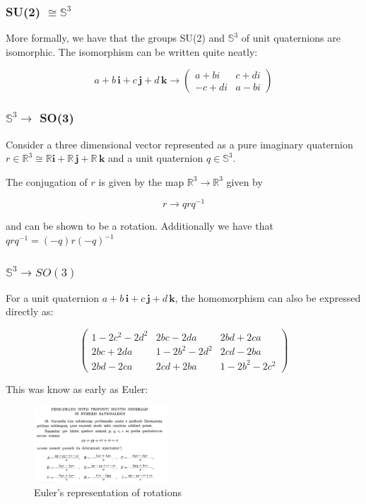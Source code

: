 \documentclass{beamer}
\begin{document}
\begin{frame}
\frametitle{SU(2) $\cong \mathbb{S} ^ 3 $ }

More formally, we have that the groups SU(2) and $\mathbb{S} ^ 3$ of unit quaternions are isomorphic. The isomorphism can be written quite neatly:

$$
a + b\,\mathbf{i} +  c\,\mathbf{j} + d\,\mathbf{k} \to
\begin{pmatrix}
      a + bi       & c + di \\
			- c + di  &  a - bi
\end{pmatrix}
$$
\end{frame}

\begin{frame}
\frametitle{$\mathbb{S} ^ 3 \to$ SO(3) }

\begin{definition}
	Consider a three dimensional vector represented as a pure imaginary quaternion $r \in \mathbb{R} ^ 3 \cong  \mathbb{R} \mathbf{i} +  \mathbb{R}\,\mathbf{j} + \mathbb{R} \,\mathbf{k}$ and a unit quaternion $q \in \mathbb{S} ^ 3$. \vspace{10pt}

The conjugation of $r$ is given by the map $\mathbb{R} ^ 3 \to \mathbb{R} ^ 3$ given by

$$
r \to q r q^{-1}
$$

and can be shown to be a rotation. Additionally we have that $q r q^{-1} = (- q) r (- q)^{-1}$ 
\end{definition}
\end{frame}

\begin{frame}
\frametitle{$\mathbb{S} ^ 3 \to SO(3) $ }

For a unit quaternion $a + b\,\mathbf{i} +  c\,\mathbf{j} + d\,\mathbf{k}$, the homomorphism can also be expressed directly as:

$$
 \begin{pmatrix}
 1 - 2 c^2 - 2 d^2 & 2 b c - 2 d a & 2 b d + 2 c a \\
 2 b c + 2 d a & 1 - 2 b^2 - 2 d^2 & 2 c d - 2 b a \\
 2 b d - 2 c a & 2 c d + 2 b a & 1 - 2 b^2 - 2 c^2
\end{pmatrix}
$$

This was know as early as Euler:

\begin{figure}
		\includegraphics[width=5cm]{Euler}
    \caption{Euler's representation of rotations}
\end{figure}

\end{frame}
\end{document}
